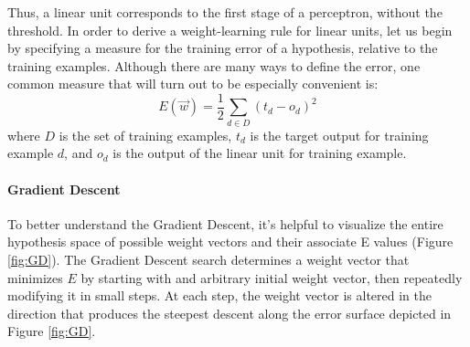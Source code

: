 \documentclass{tufte-handout}
\begin{document}
Thus, a linear unit corresponds to the first stage of a perceptron, without the threshold.
In order to derive a weight-learning rule for linear units, let us begin by specifying a measure for the training error of a hypothesis, relative to the training examples. Although there are many ways to define the error, one common measure that will turn out to be especially convenient is:
\begin{equation} \label{eq:7}
    E(\Vec{w}) = \frac{1}{2}\sum_{d\in D} (t_d - o_d)^2
\end{equation}
where $D$ is the set of training examples, $t_d$ is the target output for training example $d$, and $o_d$ is the output of the linear unit for training example. 

\paragraph{Gradient Descent}

To better understand the Gradient Descent, it's helpful to visualize the entire hypothesis space of possible weight vectors and their associate E values (Figure \ref{fig:GD}). The Gradient Descent search determines a weight vector that minimizes $E$ by starting with and arbitrary initial weight vector, then repeatedly modifying it in small steps. At each step, the weight vector is altered in the direction that produces the steepest descent along the error surface depicted in Figure \ref{fig:GD}. 

\begin{marginfigure}
\centering
{}
\caption{Generic representation of a hypothesis space}
\label{fig:GD}
\end{marginfigure}
\end{document}
